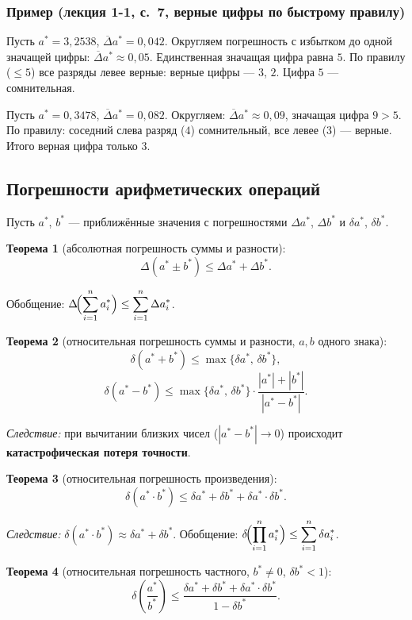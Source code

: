 \subsubsection*{Пример (лекция 1-1, с.~7, верные цифры по быстрому правилу)}

Пусть $a^* = 3{,}2538$, $\overline{\Delta} a^* = 0{,}042$. Округляем погрешность с избытком до одной значащей цифры: $\overline{\Delta} a^* \approx 0{,}05$. Единственная значащая цифра равна $5$. По правилу ($\leq 5$) все разряды левее верные: верные цифры --- $3$, $2$. Цифра $5$ --- сомнительная.

Пусть $a^* = 0{,}3478$, $\overline{\Delta} a^* = 0{,}082$. Округляем: $\overline{\Delta} a^* \approx 0{,}09$, значащая цифра $9 > 5$. По правилу: соседний слева разряд ($4$) сомнительный, все левее ($3$) --- верные. Итого верная цифра только $3$.


\subsection{Погрешности арифметических операций}

Пусть $a^*$, $b^*$ --- приближённые значения с погрешностями $\Delta a^*$, $\Delta b^*$ и $\delta a^*$, $\delta b^*$.

\textbf{Теорема 1} (абсолютная погрешность суммы и разности):
\[
    \Delta(a^* \pm b^*) \leq \Delta a^* + \Delta b^*.
\]

Обобщение: $\displaystyle\Delta\!\Bigl(\sum_{i=1}^{n} a_i^*\Bigr) \leq \sum_{i=1}^{n} \Delta a_i^*$.

\textbf{Теорема 2} (относительная погрешность суммы и разности, $a, b$ одного знака):
\[
    \delta(a^* + b^*) \leq \max\{\delta a^*,\, \delta b^*\},
\]
\[
    \delta(a^* - b^*) \leq \max\{\delta a^*,\, \delta b^*\} \cdot \frac{|a^*| + |b^*|}{|a^* - b^*|}.
\]

\textit{Следствие:} при вычитании близких чисел ($|a^* - b^*| \to 0$) происходит \textbf{катастрофическая потеря точности}.

\textbf{Теорема 3} (относительная погрешность произведения):
\[
    \delta(a^* \cdot b^*) \leq \delta a^* + \delta b^* + \delta a^* \cdot \delta b^*.
\]

\textit{Следствие:} $\delta(a^* \cdot b^*) \approx \delta a^* + \delta b^*$. Обобщение: $\displaystyle\delta\!\Bigl(\prod_{i=1}^{n} a_i^*\Bigr) \leq \sum_{i=1}^{n} \delta a_i^*$.

\textbf{Теорема 4} (относительная погрешность частного, $b^* \neq 0$, $\delta b^* < 1$):
\[
    \delta\!\left(\frac{a^*}{b^*}\right) \leq \frac{\delta a^* + \delta b^* + \delta a^* \cdot \delta b^*}{1 - \delta b^*}.
\]


